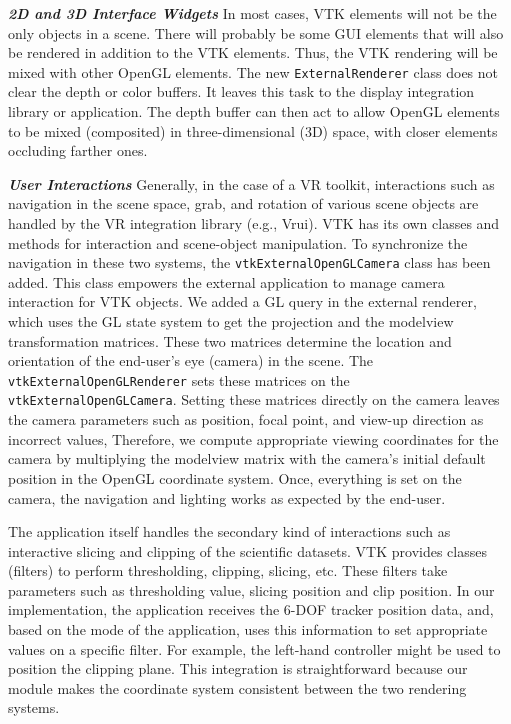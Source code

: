 \textbf{\textit{2D and 3D Interface Widgets}} In most cases, VTK elements will not be the only objects in a scene.
There will probably be some GUI elements that will also be rendered in addition to the VTK elements.
Thus, the VTK rendering will be mixed with other OpenGL elements.
The new \texttt{ExternalRenderer} class does not clear the depth or color buffers. It leaves this task to the display integration library or application.
The depth buffer can then act to allow OpenGL elements to be mixed (composited)
in three-dimensional (3D) space, with closer elements occluding farther ones.

\textbf{\textit{User Interactions}} Generally, in the case of a VR toolkit, interactions such as navigation in the scene space, grab, and rotation of various scene objects are handled by the VR integration library (e.g., Vrui).
VTK has its own classes and methods for interaction and scene-object manipulation.
To synchronize the navigation in these two systems, the \texttt{vtkExternalOpenGLCamera} class has been added.
This class empowers the external application to manage camera interaction for VTK objects.
We added a GL query in the external renderer, which uses the GL state system to get the projection and the modelview transformation matrices.
These two matrices determine the location and orientation of the end-user's eye
(camera) in the scene.
The \texttt{vtkExternalOpenGLRenderer} sets these matrices on the \texttt{vtkExternalOpenGLCamera}.
Setting these matrices directly on the camera leaves the camera parameters such as position, focal point, and view-up direction as incorrect values, Therefore, we compute appropriate viewing coordinates for the camera by multiplying the modelview matrix with the camera's initial default position in the OpenGL coordinate system. 
Once, everything is set on the camera, the navigation and lighting works as expected by the end-user.

The application itself handles the secondary kind of interactions such as interactive slicing and clipping of the scientific datasets.
VTK provides classes (filters) to perform thresholding, clipping, slicing, etc.
These filters take parameters such as thresholding value, slicing position and clip position. 
In our implementation, the application receives the 6-DOF tracker position data, and, based on the mode of the application, uses this information to set appropriate values on a specific filter.
For example, the left-hand controller might be used to position the clipping plane.
This integration is straightforward because our module makes the coordinate system consistent between the two rendering systems.

